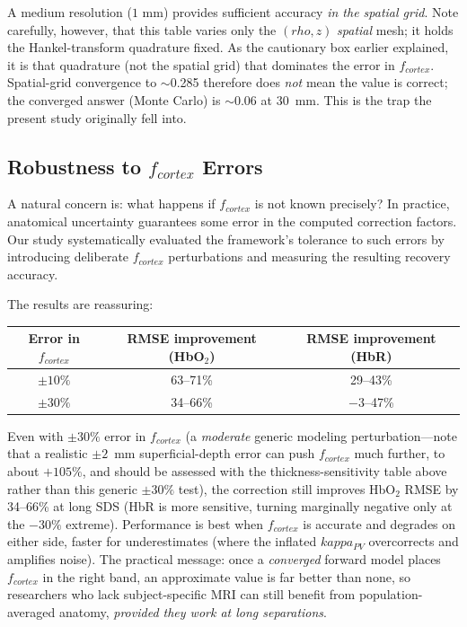 \documentclass[12pt]{article}
\def\kappa{kappa}%
\def\rho{rho}%
\def\text#1{#1}%
\begin{document}
A medium resolution ($1$ mm) provides sufficient accuracy \emph{in the spatial grid}. Note carefully, however, that this table varies only the $(\rho,z)$ \emph{spatial} mesh; it holds the Hankel-transform quadrature fixed. As the cautionary box earlier explained, it is that quadrature (not the spatial grid) that dominates the error in $f_{\text{cortex}}$. Spatial-grid convergence to $\sim$0.285 therefore does \emph{not} mean the value is correct; the converged answer (Monte Carlo) is $\sim$0.06 at 30~mm. This is the trap the present study originally fell into.

\subsection{Robustness to \texorpdfstring{$f_{\text{cortex}}$}{f\_cortex} Errors}

A natural concern is: what happens if $f_{\text{cortex}}$ is not known precisely? In practice, anatomical uncertainty guarantees some error in the computed correction factors. Our study systematically evaluated the framework's tolerance to such errors by introducing deliberate $f_{\text{cortex}}$ perturbations and measuring the resulting recovery accuracy.

The results are reassuring:

\begin{center}
\begin{tabular}{ccc}
\hline
\textbf{Error in $f_{\text{cortex}}$} & \textbf{RMSE improvement (HbO$_2$)} & \textbf{RMSE improvement (HbR)} \\
\hline
$\pm 10\%$ & 63--71\% & 29--43\% \\
$\pm 30\%$ & 34--66\% & $-3$--47\% \\
\hline
\end{tabular}
\end{center}

\begin{keyinsight}
Even with $\pm 30\%$ error in $f_{\text{cortex}}$ (a \emph{moderate} generic modeling perturbation---note that a realistic $\pm 2$~mm superficial-depth error can push $f_{\text{cortex}}$ much further, to about $+105\%$, and should be assessed with the thickness-sensitivity table above rather than this generic $\pm 30\%$ test), the correction still improves HbO$_2$ RMSE by 34--66\% at long SDS (HbR is more sensitive, turning marginally negative only at the $-30\%$ extreme). Performance is best when $f_{\text{cortex}}$ is accurate and degrades on either side, faster for underestimates (where the inflated $\kappa_{\text{PV}}$ overcorrects and amplifies noise). The practical message: once a \emph{converged} forward model places $f_{\text{cortex}}$ in the right band, an approximate value is far better than none, so researchers who lack subject-specific MRI can still benefit from population-averaged anatomy, \emph{provided they work at long separations}.
\end{keyinsight}
\end{document}
